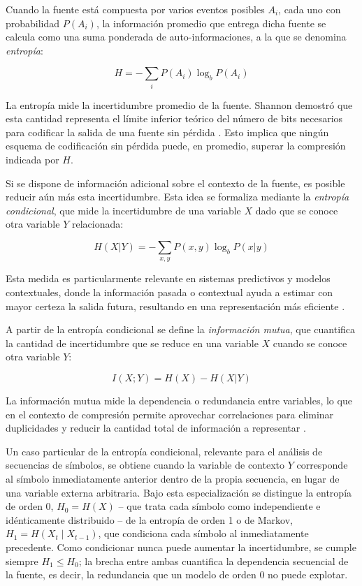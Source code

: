 Cuando la fuente está compuesta por varios eventos posibles $A_i$, cada uno con probabilidad $P(A_i)$, la información promedio que entrega dicha fuente se calcula como una suma ponderada de auto-informaciones, a la que se denomina \textit{entropía}:

\begin{equation}
H = -\sum_i P(A_i) \log_b P(A_i)
\end{equation}

La entropía mide la incertidumbre promedio de la fuente. Shannon demostró que esta cantidad representa el límite inferior teórico del número de bits necesarios para codificar la salida de una fuente sin pérdida \cite{shannon1948mathematical, sayood2006introduction, mackay_nodate}. Esto implica que ningún esquema de codificación sin pérdida puede, en promedio, superar la compresión indicada por $H$.

Si se dispone de información adicional sobre el contexto de la fuente, es posible reducir aún más esta incertidumbre. Esta idea se formaliza mediante la \textit{entropía condicional}, que mide la incertidumbre de una variable $X$ dado que se conoce otra variable $Y$ relacionada:

\begin{equation}
H(X|Y) = -\sum_{x,y} P(x, y) \log_b P(x|y)
\end{equation}

Esta medida es particularmente relevante en sistemas predictivos y modelos contextuales, donde la información pasada o contextual ayuda a estimar con mayor certeza la salida futura, resultando en una representación más eficiente \cite{sayood2006introduction}.

A partir de la entropía condicional se define la \textit{información mutua}, que cuantifica la cantidad de incertidumbre que se reduce en una variable $X$ cuando se conoce otra variable $Y$:

\begin{equation}
I(X;Y) = H(X) - H(X|Y)
\end{equation}

La información mutua mide la dependencia o redundancia entre variables, lo que en el contexto de compresión permite aprovechar correlaciones para eliminar duplicidades y reducir la cantidad total de información a representar \cite{mackay_nodate}.

Un caso particular de la entropía condicional, relevante para el análisis de secuencias de
símbolos, se obtiene cuando la variable de contexto $Y$ corresponde al símbolo inmediatamente
anterior dentro de la propia secuencia, en lugar de una variable externa arbitraria. Bajo esta
especialización se distingue la entropía de orden 0, $H_0 = H(X)$ -- que trata cada símbolo
como independiente e idénticamente distribuido -- de la entropía de orden 1 o de Markov,
$H_1 = H(X_t \mid X_{t-1})$, que condiciona cada símbolo al inmediatamente precedente. Como
condicionar nunca puede aumentar la incertidumbre, se cumple siempre $H_1 \leq H_0$; la brecha
entre ambas cuantifica la dependencia secuencial de la fuente, es decir, la redundancia que un
modelo de orden 0 no puede explotar.

